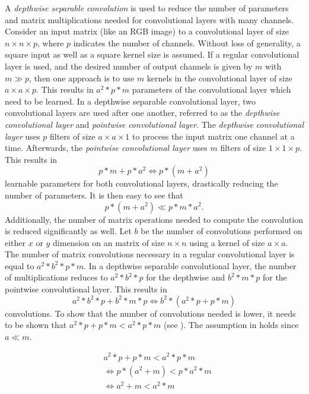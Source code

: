 A \textit{depthwise separable convolution} is used to reduce the number of parameters and matrix multiplications needed for convolutional layers with many channels.
Consider an input matrix (like an RGB image) to a convolutional layer of size $n \times n \times p$, where $p$ indicates the number of channels.
Without loss of generality, a square input as well as a square kernel size is assumed.
If a regular convolutional layer is used, and the desired number of output channels is given by $m$ with $m \gg p$, then one approach is to use $m$ kernels in the convolutional layer of size $a \times a \times p$.
This results in $a^2 * p * m$ parameters of the convolutional layer which need to be learned.
In a depthwise separable convolutional layer, two convolutional layers are used after one another, referred to as the \textit{depthwise convolutional layer} and \textit{pointwise convolutional layer}.
The \textit{depthwise convolutional layer} uses $p$ filters of size $a \times a \times 1$ to process the input matrix one channel at a time.
Afterwards, the \textit{pointwise convolutional layer} uses $m$ filters of size $1 \times 1 \times p$.
This results in $$p * m + p * a^2 \Leftrightarrow p * (m + a^2)$$ learnable parameters for both convolutional layers, drastically reducing the number of parameters.
It is then easy to see that $$p * (m + a^2) \ll p * m * a^2.$$
Additionally, the number of matrix operations needed to compute the convolution is reduced significantly as well.
Let $b$ be the number of convolutions performed on either $x$ or $y$ dimension on an matrix of size $n \times n$ using a kernel of size $a \times a$.
The number of matrix convolutions necessary in a regular convolutional layer is equal to $a^2 * b^2 * p * m$.
In a depthwise separable convolutional layer, the number of multiplications reduces to $a^2 * b^2 * p $ for the depthwise and $b^2 * m * p$ for the pointwise convolutional layer.
This results in $$a^2 * b^2 * p + b^2 * m * p \Leftrightarrow b^2 * (a^2 * p + p * m) $$ convolutions.
To show that the number of convolutions needed is lower, it needs to be shown that $a^2 * p + p * m < a^2 * p * m$ (see ).
The assumption in holds since $a \ll m$.

\begin{equation}
    \label{eq:convolution_proof}
    \begin{split}
        &a^2 * p + p * m < a^2 * p * m \\
        &\Leftrightarrow p * (a^2 + m) < p * a^2 * m \\
        &\Leftrightarrow a^2 + m < a^2 * m  
    \end{split}
\end{equation}

